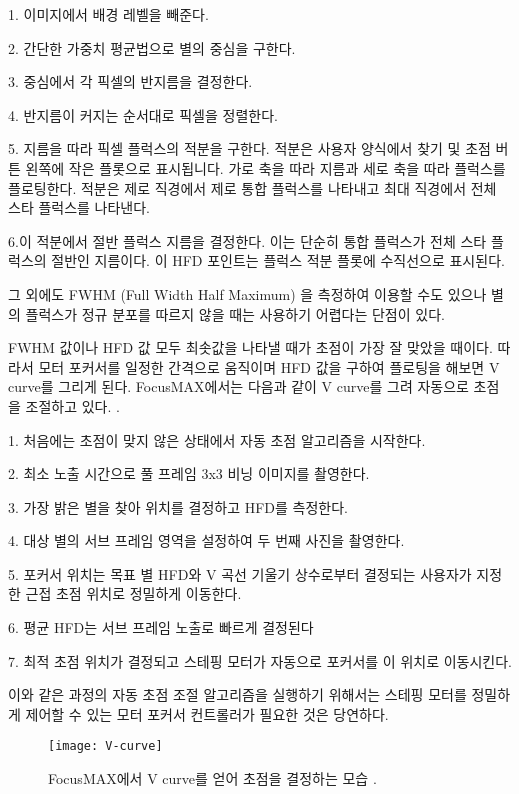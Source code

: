 1. 이미지에서 배경 레벨을 빼준다. 

2. 간단한 가중치 평균법으로 별의 중심을 구한다.

3. 중심에서 각 픽셀의 반지름을 결정한다. 

4. 반지름이 커지는 순서대로 픽셀을 정렬한다. 

5. 지름을 따라 픽셀 플럭스의 적분을 구한다. 적분은 사용자 양식에서 찾기 및 초점 버튼 왼쪽에 작은 플롯으로 표시됩니다. 가로 축을 따라 지름과 세로 축을 따라 플럭스를 플로팅한다. 적분은 제로 직경에서 제로 통합 플럭스를 나타내고 최대 직경에서 전체 스타 플럭스를 나타낸다. 

6.이 적분에서 절반 플럭스 지름을 결정한다. 이는 단순히 통합 플럭스가 전체 스타 플럭스의 절반인 지름이다. 이 HFD 포인트는 플럭스 적분 플롯에 수직선으로 표시된다. 

그 외에도 FWHM (Full Width Half Maximum) 을 측정하여 이용할 수도 있으나 별의 플럭스가 정규 분포를 따르지 않을 때는 사용하기 어렵다는 단점이 있다. 

FWHM 값이나 HFD 값 모두 최솟값을 나타낼 때가 초점이 가장 잘 맞았을 때이다. 따라서 모터 포커서를 일정한 간격으로 움직이며 HFD 값을 구하여 플로팅을 해보면 V curve를 그리게 된다. FocusMAX에서는 다음과 같이  V curve를 그려 자동으로 초점을 조절하고 있다. \cite{weber2001fast}.

1. 처음에는 초점이 맞지 않은 상태에서 자동 초점 알고리즘을 시작한다. 

2. 최소 노출 시간으로 풀 프레임 3x3 비닝 이미지를 촬영한다. 

3. 가장 밝은 별을 찾아 위치를 결정하고 HFD를 측정한다. 

4. 대상 별의 서브 프레임 영역을 설정하여 두 번째 사진을 촬영한다. 

5. 포커서 위치는 목표 별 HFD와 V 곡선 기울기 상수로부터 결정되는 사용자가 지정한 근접 초점 위치로 정밀하게 이동한다. 

6. 평균 HFD는 서브 프레임 노출로 빠르게 결정된다

7. 최적 초점 위치가 결정되고 스테핑 모터가 자동으로 포커서를 이 위치로 이동시킨다. 

이와 같은 과정의 자동 초점 조절 알고리즘을 실행하기 위해서는 스테핑 모터를 정밀하게 제어할 수 있는 모터 포커서 컨트롤러가 필요한 것은 당연하다. 

\begin{figure}[h]
	\begin{center}
		\texttt{[image: V-curve]}
	\end{center}
	\caption{FocusMAX에서 V curve를 얻어 초점을 결정하는 모습 \cite{weber2001fast}.}
	\label{fig:V-curve}
\end{figure}

